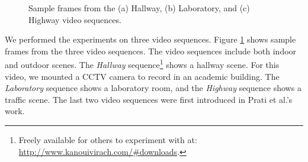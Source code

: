 \begin{figure}[t]
  \centering
  \hspace{0.05cm}
  \hspace{0.05cm}
  \caption[Sample frames from the Hallway, Laboratory, and Highway
    video sequences.]{\small Sample frames from the (a) Hallway, (b)
    Laboratory, and (c) Highway video sequences.}
  \label{fig:benchmark}
\end{figure}

We performed the experiments on three video sequences.
Figure \ref{fig:benchmark} shows sample frames from the three video
sequences. The video sequences include both indoor and outdoor
scenes. The \textit{Hallway} sequence\footnote{\small Freely 
available for others to experiment with
at: \url{http://www.kanouivirach.com/#downloads}.} shows a hallway
scene. For this video, we mounted a CCTV camera to record in an
academic building. The \textit{Laboratory} sequence shows a laboratory
room, and the \textit{Highway} sequence shows a traffic scene. The
last two video sequences were first introduced in Prati et al.'s
work\nocite{prati03shadow}.

